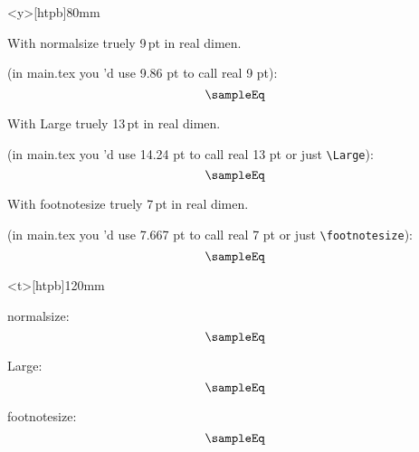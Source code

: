 \begin{minipage}<y>[htpb]{80mm}
		\vspace*{45mm}
			{\normalsize With normalsize truely 9\,pt in real dimen.
			
			(in main.tex you 'd use 9.86 pt to call real 9 pt):
				\[ \sampleEq \]\par}

			{\Large With Large truely 13\,pt in real dimen.

			(in main.tex you 'd use 14.24 pt to call real 13 pt or just \verb+\Large+):
				\[ \sampleEq \]\par}

			{\footnotesize With footnotesize truely 7\,pt in real dimen.

			(in main.tex you 'd use 7.667 pt to call real 7 pt or just \verb+\footnotesize+):
				\[ \sampleEq \]\par}
\end{minipage}

\clearpage
\begin{minipage}<t>[htpb]{120mm}
		\vspace*{10mm}
			{\normalsize normalsize:
				\[ \sampleEq \]\par}

			{\Large Large:
				\[ \sampleEq \]\par}

			{\footnotesize footnotesize:
				\[ \sampleEq \]\par}
\end{minipage}


\endinput